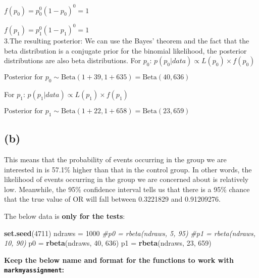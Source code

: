 \documentclass[
]{article}
\newenvironment{Shaded}{\begin{snugshade}}{\end{snugshade}}
\newcommand{\CommentTok}[1]{\textcolor[rgb]{0.56,0.35,0.01}{\textit{#1}}}
\newcommand{\DecValTok}[1]{\textcolor[rgb]{0.00,0.00,0.81}{#1}}
\newcommand{\FunctionTok}[1]{\textcolor[rgb]{0.13,0.29,0.53}{\textbf{#1}}}
\newcommand{\NormalTok}[1]{#1}
\newcommand{\OtherTok}[1]{\textcolor[rgb]{0.56,0.35,0.01}{#1}}
\begin{document}
\(f(p_0) = p_0^0(1-p_0)^0 = 1\)

\(f(p_1) = p_1^0(1-p_1)^0 = 1\)\\
3.The resulting posterior: We can use the Bayes' theorem and the fact
that the beta distribution is a conjugate prior for the binomial
likelihood, the posterior distributions are also beta distributions. For
\(p_0\): \(p(p_0|data) \propto L(p_0) \times f(p_0)\)

\(\text{Posterior for } p_0 \sim \text{Beta}(1 + 39, 1 + 635) = \text{Beta}(40,636)\)

For \(p_1\): \(p(p_1|data) \propto L(p_1) \times f(p_1)\)

\(\text{Posterior for } p_1 \sim \text{Beta}(1 + 22, 1 + 658) = \text{Beta}(23,659)\)

\hypertarget{b-1}{%
\subsection{(b)}\label{b-1}}

This means that the probability of events occurring in the group we are
interested in is 57.1\% higher than that in the control group. In other
words, the likelihood of events occurring in the group we are concerned
about is relatively low. Meanwhile, the 95\% confidence interval tells
us that there is a 95\% chance that the true value of OR will fall
between 0.3221829 and 0.91209276.

The below data is \textbf{only for the tests}:

\begin{Shaded}
\begin{Highlighting}[]
\FunctionTok{set.seed}\NormalTok{(}\DecValTok{4711}\NormalTok{)}
\NormalTok{ndraws }\OtherTok{=} \DecValTok{1000}
\CommentTok{\#p0 = rbeta(ndraws, 5, 95)}
\CommentTok{\#p1 = rbeta(ndraws, 10, 90)}
\NormalTok{p0 }\OtherTok{=} \FunctionTok{rbeta}\NormalTok{(ndraws, }\DecValTok{40}\NormalTok{, }\DecValTok{636}\NormalTok{)}
\NormalTok{p1 }\OtherTok{=} \FunctionTok{rbeta}\NormalTok{(ndraws, }\DecValTok{23}\NormalTok{, }\DecValTok{659}\NormalTok{)}
\end{Highlighting}
\end{Shaded}

\textbf{Keep the below name and format for the functions to work with
\texttt{markmyassignment}:}
\end{document}
